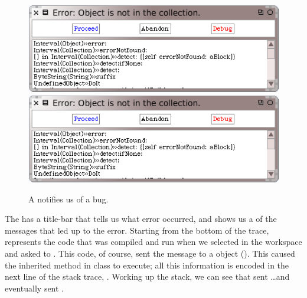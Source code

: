 \documentclass[a4paper,10pt,twoside]{book}
\begin{document}
\begin{figure}[btp]
	\begin{center}
	\ifluluelse
		{\includegraphics[scale=0.65]{PreDebugWindow}}
		{\includegraphics[scale=0.7]{PreDebugWindow}}
	\end{center}
	\caption{A  notifies us of a bug.}
	\label{fig:PreDebugWindow}
\end{figure}

The  has a title-bar that tells us what error occurred, and shows us a  of the messages that led up to the error. 
Starting from the bottom of the trace,  represents the code that was compiled and run when we selected  in the workspace and asked \sq to .
This code, of course, sent the message  to a  object (). 
This caused the inherited  method in class  to execute; all this information is encoded in the next line of the stack trace, .  
Working up the stack, we can see that  sent \ldots and eventually  sent .
\end{document}
